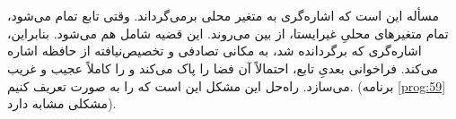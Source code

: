 \section{}
\paragraph{}\label{answer:18}
مسأله این است که  اشاره‌گری به متغیر محلی  برمی‌گرداند. وقتی تابع تمام می‌شود، تمام متغیرهای محلیِ غیرایستا، از بین می‌روند. این قضیه شامل  هم می‌شود. بنابراین، اشاره‌گری که برگردانده شد، به مکانی تصادفی و تخصیص‌نیافته از حافظه اشاره می‌کند. فراخوانی بعدیِ تابع، احتمالاً آن فضا را پاک می‌کند و  را کاملاً عجیب و غریب می‌سازد. راه‌حل این مشکل این است که  را به صورت  تعریف کنیم. (برنامه \ref{prog:59} مشکلی مشابه دارد).